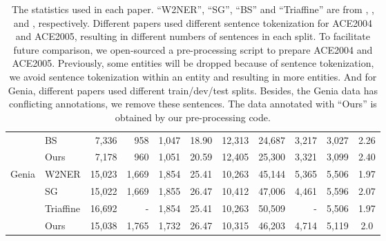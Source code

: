\documentclass[11pt]{article}
\begin{document}
\begin{table*}[!ht]
\begin{table*}[]
\begin{tabular}{clrrrcrrrrc}
                           & BS    & 7,336                        & 958                       & 1,047                       & 18.90                         & 12,313                       & 24,687                       & 3,217                      & 3,027                       & 2.26                         \\
                           & Ours  & 7,178                        & 960                       & 1,051                       & 20.59                        & 12,405                       & 25,300                       & 3,321                      & 3,099                       & 2.40                          \\
                           \midrule
  \multirow{4}{*}{Genia}   & W2NER & 15,023 & 1,669 & 1,854 & 25.41 & 10,263 & 45,144 & 5,365 & 5,506 & 1.97 \\
                           & SG    & 15,022 & 1,669 & 1,855 & 26.47 & 10,412 & 47,006 & 4,461 & 5,596 & 2.07                       \\
                           & Triaffine    & 16,692 & - & 1,854 & 25.41 & 10,263 & 50,509 & - & 5,506 & 1.97                       \\

& Ours & 15,038 & 1,765 & 1,732 & 26.47 & 10,315 & 46,203 & 4,714 & 5,119 & 2.0 \\
  \bottomrule                          
  \end{tabular}
  \caption{The statistics used in each paper. ``W2NER''\protect\footnotemark, ``SG'', ``BS'' and ``Triaffine'' are from \cite{DBLP:conf/aaai/Li00WZTJL22}, \cite{DBLP:conf/acl/WanR0022}, \cite{DBLP:conf/acl/Zhu022} and \cite{DBLP:conf/acl/0002THH22}, respectively. Different papers used different sentence tokenization for ACE2004 and ACE2005, resulting in different numbers of sentences in each split. To facilitate future comparison, we open-sourced a pre-processing script to prepare ACE2004 and ACE2005. Previously, some entities will be dropped because of sentence tokenization, we avoid sentence tokenization within an entity and resulting in more entities. And for Genia, different papers used different train/dev/test splits. Besides, the Genia data has conflicting annotations, we remove these sentences. The data annotated with ``Ours'' is obtained by our pre-processing code.}
  \label{tab:statistics}
\end{table*}





\end{table*}
\end{document}
